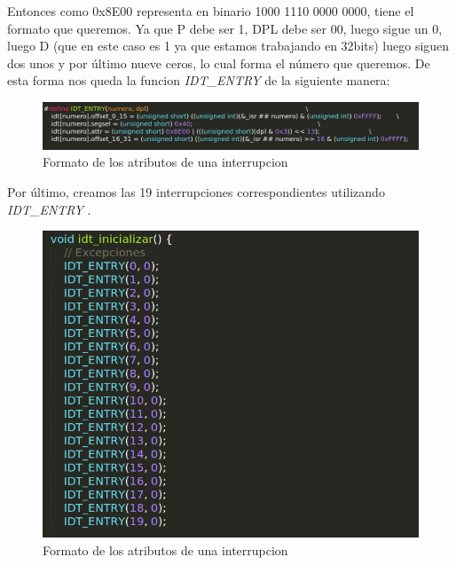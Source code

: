 Entonces como 0x8E00 representa en binario 1000 1110 0000 0000, tiene el formato que queremos. Ya que P debe ser 1, DPL debe ser 00, luego sigue un 0, luego D (que en este caso es 1 ya que estamos trabajando en 32bits) luego siguen dos unos y por último nueve ceros, lo cual forma el número que queremos. De esta forma nos queda la funcion \textit{IDT\_ENTRY} de la siguiente manera:

 \begin{figure}[H]
\begin{center}
  \includegraphics[width=\linewidth]{ejercicio2/idtentry.png}
  \caption{{\small Formato de los atributos de una interrupcion} }
\endminipage
\end{center}
\end{figure}

Por último, creamos las 19 interrupciones correspondientes utilizando \textit{IDT\_ENTRY}  .

 \begin{figure}[H]
\begin{center}
  \includegraphics[width=\linewidth]{ejercicio2/idt.png}
  \caption{{\small Formato de los atributos de una interrupcion} }
\endminipage
\end{center}
\end{figure}
